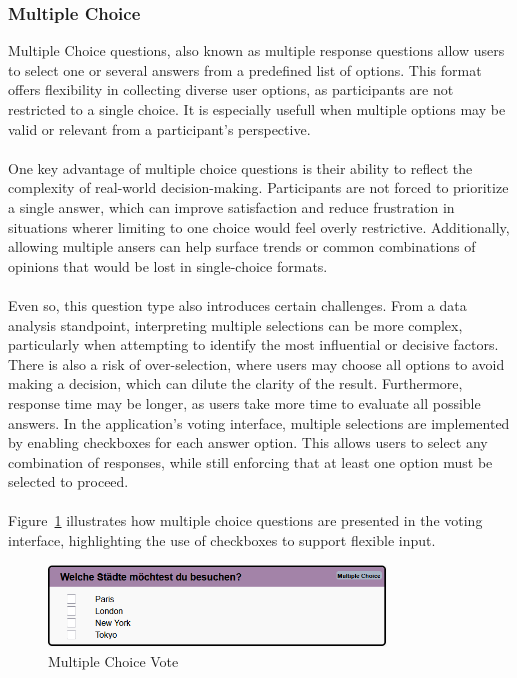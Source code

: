 \documentclass[a4paper,12pt]{report}
\begin{document}
\subsubsection{Multiple Choice}
Multiple Choice questions, also known as multiple response questions allow users to select one or several answers from a predefined list of options. This format offers flexibility in collecting diverse user options, as participants are not restricted to a single choice. It is especially usefull when multiple options may be valid or relevant from a participant's perspective.\\\\
One key advantage of multiple choice questions is their ability to reflect the complexity of real-world decision-making. Participants are not forced to prioritize a single answer, which can improve satisfaction and reduce frustration in situations wherer limiting to one choice would feel overly restrictive. Additionally, allowing multiple ansers can help surface trends or common combinations of opinions that would be lost in single-choice formats.\parencite{singlevsmultiple}\\\\
Even so, this question type also introduces certain challenges. From a data analysis standpoint, interpreting multiple selections can be more complex, particularly when attempting to identify the most influential or decisive factors. There is also a risk of over-selection, where users may choose all options to avoid making a decision, which can dilute the clarity of the result. Furthermore, response time may be longer, as users take more time to evaluate all possible answers.\parencite{singlevsmultiple}
In the application's voting interface, multiple selections are implemented by enabling checkboxes for each answer option. This allows users to select any combination of responses, while still enforcing that at least one option must be selected to proceed.\\\\
Figure~\ref{fig:multiplechoice} illustrates how multiple choice questions are presented in the voting interface, highlighting the use of checkboxes to support flexible input.
\begin{figure}[H]	
	\centering	
	\includegraphics[width=0.8\textwidth]{pics/Multiple_Choice.png}	
	\caption{Multiple Choice Vote}	
	\label{fig:multiplechoice}
\end{figure}
\end{document}
